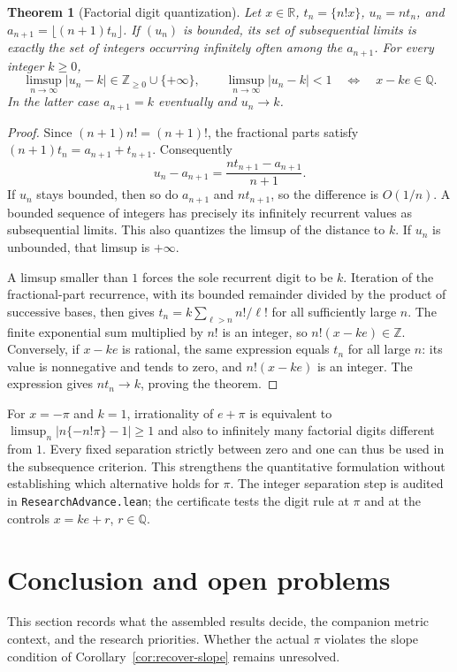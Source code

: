 \documentclass[11pt]{amsart}
\newtheorem{theorem}{Theorem}[section]
\theoremstyle{definition}
\theoremstyle{remark}
\numberwithin{equation}{section}
\newcommand{\Q}{\mathbb{Q}}
\newcommand{\R}{\mathbb{R}}
\newcommand{\Z}{\mathbb{Z}}
\begin{document}
\begin{theorem}[Factorial digit quantization]\label{thm:factorial-quantization}
Let $x\in\R$, $t_n=\{n!x\}$, $u_n=nt_n$, and
$a_{n+1}=\lfloor(n+1)t_n\rfloor$. If $(u_n)$ is bounded, its set of
subsequential limits is exactly the set of integers occurring
infinitely often among the $a_{n+1}$. For every integer $k\ge0$,
\[
 \limsup_{n\to\infty}|u_n-k|\in\Z_{\ge0}\cup\{+\infty\},
 \qquad
 \limsup_{n\to\infty}|u_n-k|<1
       \quad\Longleftrightarrow\quad x-ke\in\Q.
\]
In the latter case $a_{n+1}=k$ eventually and $u_n\to k$.
\end{theorem}
\begin{proof}
Since $(n+1)n!=(n+1)!$, the fractional parts satisfy
$(n+1)t_n=a_{n+1}+t_{n+1}$. Consequently
\[
 u_n-a_{n+1}=\frac{n t_{n+1}-a_{n+1}}{n+1}.
\]
If $u_n$ stays bounded, then so do $a_{n+1}$ and $nt_{n+1}$,
so the difference is $O(1/n)$. A bounded sequence of integers has
precisely its infinitely recurrent values as subsequential limits.
This also quantizes the limsup of the distance to $k$. If $u_n$ is
unbounded, that limsup is $+\infty$.

A limsup smaller than $1$ forces the sole recurrent digit to be $k$.
Iteration of the fractional-part recurrence, with its bounded
remainder divided by the product of successive bases, then gives
$t_n=k\sum_{\ell>n}n!/\ell!$ for all sufficiently large $n$.
The finite exponential sum multiplied by $n!$ is an integer, so
$n!(x-ke)\in\Z$. Conversely, if $x-ke$ is rational, the same
expression equals $t_n$ for all large $n$: its value is nonnegative
and tends to zero, and $n!(x-ke)$ is an integer. The expression gives
$nt_n\to k$, proving the theorem.
\end{proof}
For $x=-\pi$ and $k=1$, irrationality of $e+\pi$ is equivalent to
$\limsup_n|n\{-n!\pi\}-1|\ge1$ and also to infinitely many factorial
digits different from $1$. Every fixed separation strictly between
zero and one can thus be used in the subsequence criterion.
This strengthens the quantitative formulation without establishing
which alternative holds for $\pi$. The integer separation step is
audited in \texttt{ResearchAdvance.lean}; the certificate tests the
digit rule at $\pi$ and at the controls $x=ke+r$, $r\in\Q$.


\section{Conclusion and open problems}\label{sec:conclusion}

This section records what the assembled results decide, the
companion metric context, and the research priorities. Whether the
actual $\pi$ violates the slope condition of
Corollary~\ref{cor:recover-slope} remains unresolved.
\end{document}
